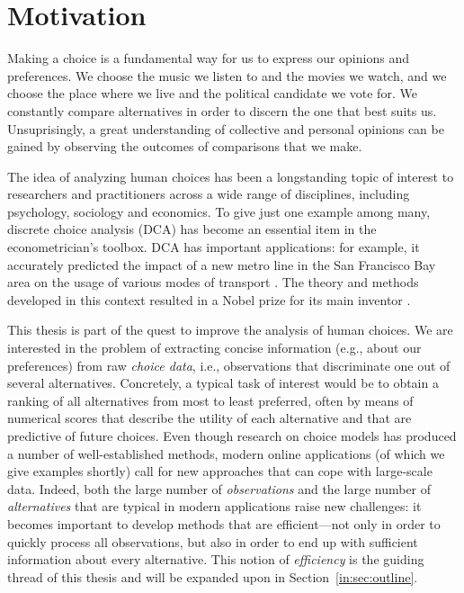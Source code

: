 \section{Motivation}
\label{in:sec:motivation}

Making a choice is a fundamental way for us to express our opinions and preferences.
We choose the music we listen to and the movies we watch, and we choose the place where we live and the political candidate we vote for.
We constantly compare alternatives in order to discern the one that best suits us.
Unsuprisingly, a great understanding of collective and personal opinions can be gained by observing the outcomes of comparisons that we make.

The idea of analyzing human choices has been a longstanding topic of interest to researchers and practitioners across a wide range of disciplines, including psychology, sociology and economics.
To give just one example among many, discrete choice analysis (DCA) has become an essential item in the econometrician's toolbox.
DCA has important applications: for example, it accurately predicted the impact of a new metro line in the San Francisco Bay area on the usage of various modes of transport \citep{mcfadden1977demand}.
The theory and methods developed in this context resulted in a Nobel prize for its main inventor \citep{mcfadden2001economic}.

This thesis is part of the quest to improve the analysis of human choices.
We are interested in the problem of extracting concise information (e.g., about our preferences) from raw \emph{choice data}, i.e., observations that discriminate one out of several alternatives.
Concretely, a typical task of interest would be to obtain a ranking of all alternatives from most to least preferred, often by means of numerical scores that describe the utility of each alternative and that are predictive of future choices.
Even though research on choice models has produced a number of well-established methods, modern online applications (of which we give examples shortly) call for new approaches that can cope with large-scale data.
Indeed, both the large number of \emph{observations} and the large number of \emph{alternatives} that are typical in modern applications raise new challenges:
it becomes important to develop methods that are efficient---not only in order to quickly process all observations, but also in order to end up with sufficient information about every alternative.
This notion of \emph{efficiency} is the guiding thread of this thesis and will be expanded upon in Section~\ref{in:sec:outline}.

